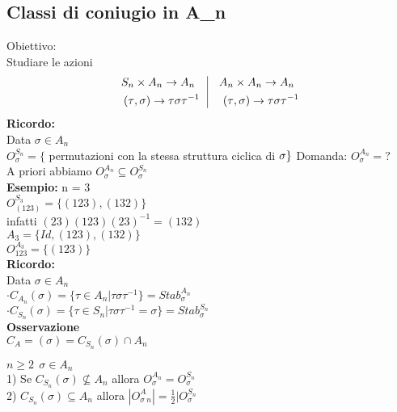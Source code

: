 \documentclass[12px]{article}
\begin{document}
	   \subsection{Classi di coniugio in A_n}
	   Obiettivo:\\
	   Studiare le azioni
	   \[
	    \begin{aligned}
		    S_n &\times A_n \rightarrow A_n\\
		    (\tau &,\sigma) \rightarrow\tau\sigma\tau^{-1}
	   	
	   \end{aligned} \ \ 
	   \vline \ \ \ 
	   \begin{aligned}
		   A_n&\times A_n \rightarrow A_n\\
		   (\tau&,\sigma) \rightarrow\tau\sigma \tau^{-1}
	   \end{aligned}
   \]
   \textbf{Ricordo:}\\
   Data $\sigma\in A_n$\\
   $O_\sigma^{S_n} = \{$ permutazioni con la stessa struttura ciclica di $\sigma\}\\$
   Domanda:  $O_\sigma^{A_n} = ?$\\
   A priori abbiamo  $O_\sigma^{A_n}\subseteq O_\sigma^{S_n}$\\
    \textbf{Esempio:} n = 3\\
    $O^{S_3}_{(123)} = \{(123),(132)\}$\\
    infatti $(23)(123)(23)^{-1} = (132)$\\
    $A_3 = \{Id,(123),(132)\}$\\
    $O^{A_3}_{123} = \{(123)\}$\\
    \textbf{Ricordo:}\\
    Data $\sigma\in A_n$\\
    $\cdot C_{A_n}(\sigma) = \{\tau\in A_n|\tau\sigma\tau^{-1}\} = Stab^{A_n}_\sigma$\\
    $\cdot C_{S_n}(\sigma) = \{\tau\in S_n | \tau\sigma\tau^{-1} = \sigma\} = Stab_\sigma^{S_n}$\\
     \textbf{Osservazione}\\
     $C_A = (\sigma) = C_{S_n}(\sigma)\cap A_n$\\
      \begin{teo}
     	$n\geq 2 \ \ \sigma \in A_n$ \\
	1) Se $C_{S_n}(\sigma )\not\subseteq A_n$ allora $O_\sigma^{A_n} = O_\sigma^{S_n}$\\
	2) $C_{S_n}(\sigma)\subseteq A_n$ allora $|O_\sigma^A_n| = \frac 12 |O_\sigma^{S_n}$
\end{teo}
\end{document}
